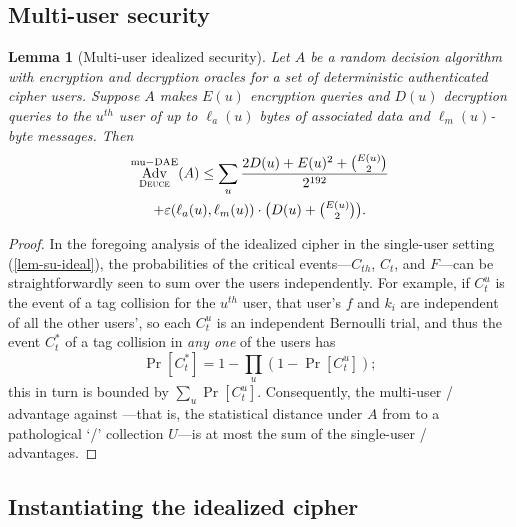 \documentclass[draft]{article}
\newtheorem{lemma}{Lemma}
\def\operatorsc#1{{%
  \ifmmode\let\next=\operatorname\else\let\next=\relax\fi\next{\textsc{#1}}}}
\def\Deuce/{\operatorsc{Deuce}}
\DeclareMathOperator{\Adv}{Adv}
\DeclareMathOperator{\muDAE}{mu-DAE}
\newcommand{\collisionbound}{\varepsilon}
\begin{document}
\subsection{Multi-user security}

\begin{lemma}[Multi-user idealized security]\label{lem-mu-ideal}
  Let $A$ be a random decision algorithm with encryption and
   decryption oracles for a \emph{set} of deterministic authenticated
   cipher users.
  Suppose $A$ makes $E(u)$ encryption queries and $D(u)$ decryption
   queries to the $u^{\mathit{th}}$ user of up to $\ell_a(u)$ bytes of
   associated data and $\ell_m(u)$-byte messages.
  Then
%
  \begin{multline*}
    \Adv^{\muDAE}_{\Deuce/}(A)
    \leq \sum_u \frac{2 D(u) + E(u)^2 + \binom{E(u)}{2}}
                     {2^{192}} \\
           + \collisionbound(\ell_a(u), \ell_m(u))
             \cdot
             {\textstyle\bigl(D(u) + \binom{E(u)}{2}\bigr)}.
  \end{multline*}
\end{lemma}

\begin{proof}
  In the foregoing analysis of the idealized cipher \Deuce/ in the
   single-user setting (\autoref{lem-su-ideal}), the probabilities of
   the critical events---$C_{th}$, $C_t$, and $F$---can be
   straightforwardly seen to sum over the users independently.
  For example, if $C_t^u$ is the event of a tag collision for the
   $u^{\mathit{th}}$ user, that user's $f$ and $k_i$ are independent of
   all the other users', so each $C_t^u$ is an independent Bernoulli
   trial, and thus the event $C_t^*$ of a tag collision in
   \emph{any one} of the users has
  \[
    \Pr[C_t^*] = 1 - \prod_u (1 - \Pr[C_t^u]);
  \]
   this in turn is bounded by $\sum_u \Pr[C_t^u]$.
  Consequently, the multi-user \DAE/ advantage against \Deuce/---that
   is, the statistical distance under $A$ from \Deuce/ to a
   pathological `\DAE/' collection $U$---is at most the sum of the
   single-user \DAE/ advantages.
\end{proof}

\subsection{Instantiating the idealized cipher}
\end{document}
